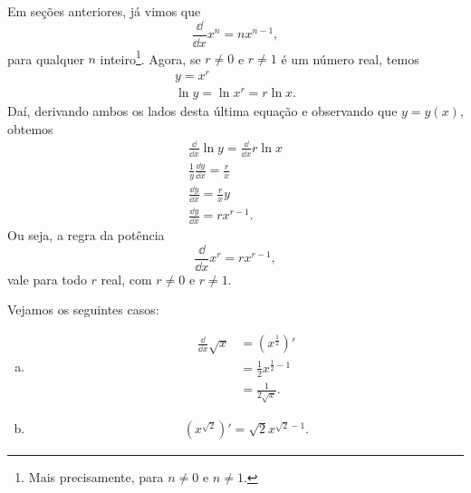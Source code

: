 \begin{obs}
  Em seções anteriores, já vimos que
  \begin{equation}
    \frac{\dd}{\dd x}x^n = nx^{n-1},
  \end{equation}
  para qualquer $n$ inteiro\footnote{Mais precisamente, para $n\neq 0$ e $n\neq 1$.}. Agora, se $r\neq 0$ e $r\neq 1$ é um número real, temos
  \begin{gather}
    y = x^r \\
    \ln y = \ln x^r = r\ln x.
  \end{gather}
  Daí, derivando ambos os lados desta última equação e observando que $y = y(x)$, obtemos
  \begin{gather}
    \frac{\dd}{\dd x} \ln y = \frac{\dd}{\dd x} r\ln x \\
    \frac{1}{y}\frac{\dd y}{\dd x} = \frac{r}{x} \\
    \frac{\dd y}{\dd x} = \frac{r}{x}y \\
    \frac{\dd y}{\dd x} = rx^{r-1}.
  \end{gather}
  Ou seja, a regra da potência
  \begin{equation}
    \frac{\dd}{\dd x}x^r = rx^{r-1},
  \end{equation}
  vale para todo $r$ real, com $r\neq 0$ e $r\neq 1$.
\end{obs}

\begin{ex}
  Vejamos os seguintes casos:
  \begin{enumerate}[a)]
  \item
    \begin{align}
      \frac{\dd}{\dd x}\sqrt{x} &= \left(x^{\frac{1}{2}}\right)' \\
                                &= \frac{1}{2}x^{\frac{1}{2}-1} \\
                                &= \frac{1}{2\sqrt{x}}.
    \end{align}
  \item
    \begin{align}
      \left(x^{\sqrt{2}}\right)' = \sqrt{2}x^{\sqrt{2}-1}.
    \end{align}
  \end{enumerate}
\end{ex}

